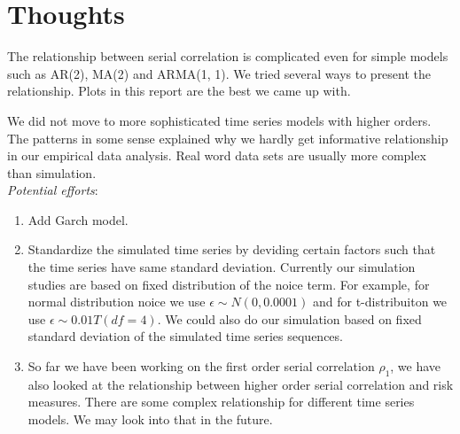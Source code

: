 \documentclass[11pt]{article}
\begin{document}
\section{Thoughts}  %

The relationship between serial correlation is complicated even for simple models such as AR(2), MA(2) and ARMA(1, 1). We tried several ways to present the relationship. Plots in this report are the best we came up with.

We did not move to more sophisticated time series models with higher orders. The patterns in some sense explained why we hardly get informative relationship in our empirical data analysis. Real word data sets are usually more complex than simulation.\\

\textit{Potential efforts}:
\begin{enumerate}
\item Add Garch model.
\item Standardize the simulated time series by deviding certain factors such that the time series have same standard deviation. Currently our simulation studies are based on fixed distribution of the noice term. For example, for normal distribution noice we use $\epsilon \sim N(0, 0.0001)$ and for t-distribuiton we use $\epsilon \sim 0.01T(df =4)$. We could also do our simulation based on fixed standard deviation of the simulated time series sequences.
\item So far we have been working on the first order serial correlation $\rho_1$, we have also looked at the relationship between higher order serial correlation and risk measures. There are some complex relationship for different time series models. We may look into that in the future. 
\end{enumerate}
\end{document}

